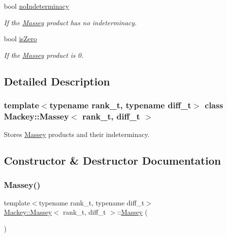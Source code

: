 \begin{DoxyCompactItemize}
bool \hyperlink{classMackey_1_1Massey_a4dbd74288447b094c8308f4d68bf8cff}{no\+Indeterminacy}
\begin{DoxyCompactList}\small\item\em If the \hyperlink{classMackey_1_1Massey}{Massey} product has no indeterminacy. \end{DoxyCompactList}\item 
bool \hyperlink{classMackey_1_1Massey_a8e1b4f51835a4de55c6d10e14a607189}{is\+Zero}
\begin{DoxyCompactList}\small\item\em If the \hyperlink{classMackey_1_1Massey}{Massey} product is 0. \end{DoxyCompactList}\end{DoxyCompactItemize}


\subsection{Detailed Description}
\subsubsection*{template$<$typename rank\+\_\+t, typename diff\+\_\+t$>$\newline
class Mackey\+::\+Massey$<$ rank\+\_\+t, diff\+\_\+t $>$}

Stores \hyperlink{classMackey_1_1Massey}{Massey} products and their indeterminacy. 

\subsection{Constructor \& Destructor Documentation}
\mbox{\label{classMackey_1_1Massey_a9e48aaa79f409e96ae2051719710315c}} 
\subsubsection{\texorpdfstring{Massey()}{Massey()}\hspace{0.1cm}{\footnotesize\ttfamily [1/2]}}
{\footnotesize\ttfamily template$<$typename rank\+\_\+t, typename diff\+\_\+t$>$ \\
\hyperlink{classMackey_1_1Massey}{Mackey\+::\+Massey}$<$ rank\+\_\+t, diff\+\_\+t $>$\+::\hyperlink{classMackey_1_1Massey}{Massey} (\begin{DoxyParamCaption}{ }\end{DoxyParamCaption})\hspace{0.3cm}{\ttfamily [inline]}}




